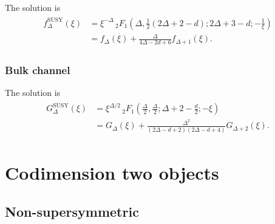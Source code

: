 \documentclass[letterpaper]{article}
\let\Oldsection\section
\renewcommand{\section}{\FloatBarrier\Oldsection}
\let\Oldsubsection\subsection
\renewcommand{\subsection}{\FloatBarrier\Oldsubsection}
\let\Oldsubsubsection\subsubsection
\renewcommand{\subsubsection}{\FloatBarrier\Oldsubsubsection}
\begin{document}
The solution is
\begin{align}
\begin{split}
 f_\Delta^{\text{SUSY}}(\xi) 
 & = \xi ^{-\Delta } \, _2F_1\left(\Delta ,\frac{1}{2} (2 \Delta + 2-d);2 \Delta +3-d;-\frac{1}{\xi }\right) \\
 & = f_\Delta(\xi) + \frac{\Delta }{4\Delta - 2d + 6} f_{\Delta+1}(\xi).
\end{split}
\end{align}


\subsubsection{Bulk channel}

The solution is
\begin{align}
\begin{split}
 G_\Delta^{\text{SUSY}}(\xi) 
 & = \xi ^{\Delta /2} \, _2F_1\left(\frac{\Delta }{2},\frac{\Delta }{2};\Delta +2 -\frac{d}{2};-\xi \right) \\
 & = G_\Delta(\xi) 
   + \frac{\Delta ^2}{(2 \Delta -d +2) (2 \Delta -d +4)} G_{\Delta+2}(\xi).
\end{split}
\end{align}

\section{Codimension two objects}

\subsection{Non-supersymmetric}
\end{document}
